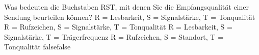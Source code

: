     {Was bedeuten die Buchstaben RST, mit denen Sie die Empfangsqualität einer Sendung beurteilen können?}
    {R = Lesbarkeit, S = Signalstärke, T = Tonqualität}
    {R = Rufzeichen, S = Signalstärke, T = Tonqualität}
    {R = Lesbarkeit, S = Signalstärke, T = Trägerfrequenz}
    {R = Rufzeichen, S = Standort, T = Tonqualität}
    {false}{false}